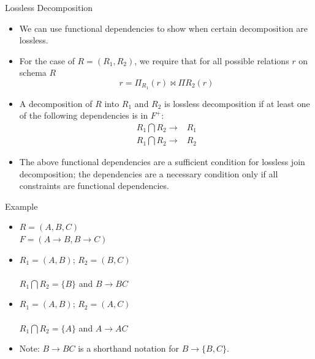\documentclass{beamer}
\begin{document}
\begin{frame}{Lossless Decomposition}
    \begin{itemize}
        \item We can use functional dependencies to show when certain decomposition are lossless.
        \item For the case of $R = (R_1, R_2)$, we require that for all possible relations $r$ on schema $R$
            $$
                r = \Pi_{R_1}(r) \Join \Pi{R_2}(r)
            $$
        \item A decomposition of $R$ into $R_1$ and $R_2$ is lossless decomposition if at least one of the following dependencies is in $F^+$:
        \begin{equation*}
            \begin{align*}
                R_1 \bigcap R_2 \rightarrow& R_1 \\
                R_1 \bigcap R_2 \rightarrow& R_2
            \end{align*}
        \end{equation*}
        \item The above functional dependencies are a sufficient condition for lossless join decomposition; the dependencies are a necessary condition only if all constraints are functional dependencies.
    \end{itemize}
\end{frame}

\begin{frame}{Example}
    \begin{itemize}
        \item $R = (A, B, C)$\\
            $F = (A \rightarrow B, B \rightarrow C)$
        \item $R_1 = (A, B)$; $R_2 = (B, C)$ \\
             \\
            $R_1 \bigcap R_2 = \{B\}$  and $B \rightarrow BC$
        \item $R_1 = (A, B)$; $R_2 = (A, C)$ \\
             \\
            $R_1 \bigcap R_2 = \{A\}$  and $A \rightarrow AC$
        \item Note: $B \rightarrow BC$ is a shorthand notation for $B \rightarrow \{B, C\}$.
    \end{itemize}
\end{frame}
\end{document}

